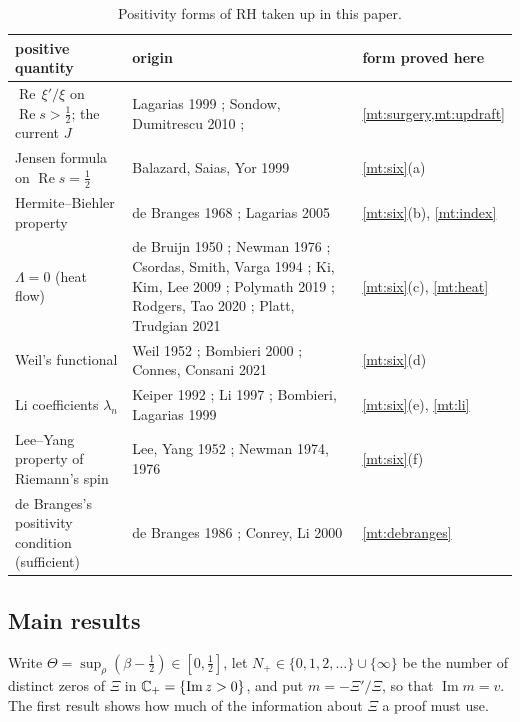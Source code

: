 \documentclass[11pt]{article}
\theoremstyle{definition}\newtheorem{definition}[theorem]{Definition}
\theoremstyle{remark}\newtheorem{remark}[theorem]{Remark}
\renewcommand{\Re}{\operatorname{Re}}\renewcommand{\Im}{\operatorname{Im}}
\begin{document}
\begin{table}[h]\centering\small
\begin{tabular}{@{}>{\raggedright\arraybackslash}p{3.9cm}>{\raggedright\arraybackslash}p{6.2cm}>{\raggedright\arraybackslash}p{3.6cm}@{}}\toprule
positive quantity & origin & form proved here\\\midrule
$\Re\,\xi'/\xi$ on $\Re s>\frac12$; the current $J$ & Lagarias 1999 \cite{Lagarias99}; Sondow, Dumitrescu 2010 \cite{SD}; \cite{S01} & \cref{mt:surgery,mt:updraft}\\
Jensen formula on $\Re s=\frac12$ & Balazard, Saias, Yor 1999 \cite{BSY} & \cref{mt:six}(a)\\
Hermite--Biehler property & de Branges 1968 \cite{deBrangesBook}; Lagarias 2005 \cite{Lagarias05} & \cref{mt:six}(b), \cref{mt:index}\\
$\Lambda=0$ (heat flow) & de Bruijn 1950 \cite{deBruijn}; Newman 1976 \cite{Newman76}; Csordas, Smith, Varga 1994 \cite{CSV}; Ki, Kim, Lee 2009 \cite{KKL}; Polymath 2019 \cite{Polymath}; Rodgers, Tao 2020 \cite{RT}; Platt, Trudgian 2021 \cite{PT} & \cref{mt:six}(c), \cref{mt:heat}\\
Weil's functional & Weil 1952 \cite{Weil}; Bombieri 2000 \cite{Bombieri}; Connes, Consani 2021 \cite{CC} & \cref{mt:six}(d)\\
Li coefficients $\lambda_n$ & Keiper 1992 \cite{Keiper}; Li 1997 \cite{Li}; Bombieri, Lagarias 1999 \cite{BL} & \cref{mt:six}(e), \cref{mt:li}\\
Lee--Yang property of Riemann's spin & Lee, Yang 1952 \cite{LeeYang}; Newman 1974, 1976 \cite{Newman74,Newman76} & \cref{mt:six}(f)\\
de Branges's positivity condition (sufficient) & de Branges 1986 \cite{deBranges86}; Conrey, Li 2000 \cite{CL} & \cref{mt:debranges}\\\bottomrule
\end{tabular}
\caption{Positivity forms of RH taken up in this paper.}\label{tab:forms}
\end{table}

\subsection{Main results}
Write $\Theta=\sup_\rho(\beta-\frac12)\in[0,\frac12]$, let $N_+\in\{0,1,2,\dots\}\cup\{\infty\}$ be the number of distinct zeros of $\Xi$ in $\C_+=\{\Im z>0\}$, and put $m=-\Xi'/\Xi$, so that $\Im m=v$. The first result shows how much of the information about $\Xi$ a proof must use.
\end{document}

